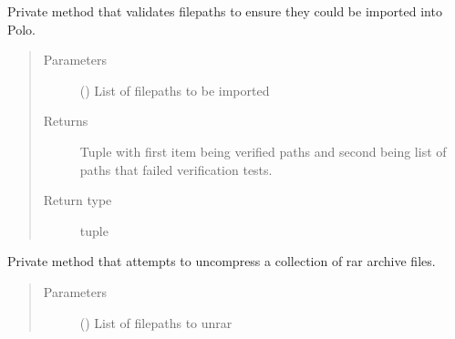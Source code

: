 \documentclass[letterpaper,10pt,english]{sphinxmanual}
\begin{document}
\begin{fulllineitems}
\begin{fulllineitems}
\begin{quote}
\begin{description}
\end{description}\end{quote}

\end{fulllineitems}


\begin{fulllineitems}
\label{\detokenize{polo.windows:polo.windows.run_importer.RunImporterDialog._test_candidate_paths}}
Private method that validates filepaths to ensure they could be
imported into Polo.
\begin{quote}\begin{description}
\item[{Parameters}] \leavevmode
{} () \textendash{} List of filepaths to be imported

\item[{Returns}] \leavevmode
Tuple with first item being verified paths and second being
list of paths that failed verification tests.

\item[{Return type}] \leavevmode
tuple

\end{description}\end{quote}

\end{fulllineitems}


\begin{fulllineitems}
\label{\detokenize{polo.windows:polo.windows.run_importer.RunImporterDialog._unrar_candidate_paths}}
Private method that attempts to un\sphinxhyphen{}compress a collection of rar
archive files.
\begin{quote}\begin{description}
\item[{Parameters}] \leavevmode
{} () \textendash{} List of filepaths to unrar


\end{description}
\end{quote}
\end{fulllineitems}
\end{fulllineitems}
\end{document}
